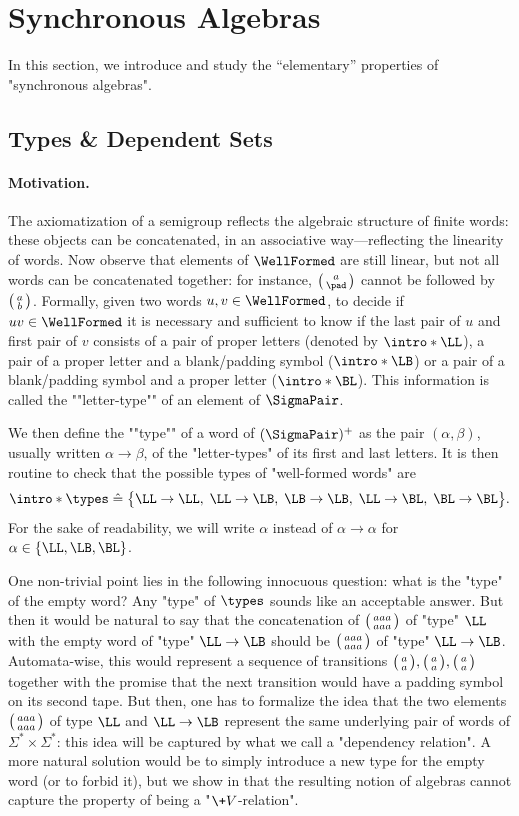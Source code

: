 \section{Synchronous Algebras}
\label{sec:synchronous-algebras}

In this section, we introduce and study the ``elementary'' properties of "synchronous algebras".

\subsection{Types \& Dependent Sets}

\paragraph*{Motivation.} The axiomatization of a semigroup reflects the algebraic structure of
finite words: these objects can be concatenated, in an associative way---reflecting the linearity of 
words. Now observe that elements of $\WellFormed$ are still linear, but
not all words can be concatenated together: for instance, $\pair{a}{\pad}$
cannot be followed by $\pair{a}{b}$.
Formally, given two words $u, v \in \WellFormed$, to decide if $uv \in \WellFormed$
it is necessary and sufficient to know if the last pair of $u$ and first pair of $v$
consists of a pair of proper letters (denoted by \AP$\intro*\LL$), a pair of a proper letter and a blank/padding symbol (\AP$\intro*\LB$) or a pair of a blank/padding symbol and a proper letter (\AP$\intro*\BL$). This information is called the \AP""letter-type"" of an element of $\SigmaPair$.

We then define the \AP""type"" of a word of $(\SigmaPair)^+$ as the pair $(\alpha, \beta)$,
usually written $\alpha \to \beta$, of the "letter-types" of its first and last letters.
It is then routine to check that the possible types of "well-formed words" are
\[
	\intro*\types \defeq \big\{
		\LL\to\LL,\; \LL\to\LB,\; \LB\to\LB,\; \LL\to\BL,\; \BL\to\BL
	\big\}.
\]
For the sake of readability, we will write $\alpha$ instead of $\alpha \to \alpha$
for $\alpha \in \{\LL, \LB, \BL\}$.

One non-trivial point lies in the following innocuous question: what is the "type" of the empty word? Any "type" of $\types$ sounds like an acceptable answer. But then
it would be natural to say that the concatenation of $\pair{aaa}{aaa}$ of "type" $\LL$ with the empty word of "type" $\LL\to\LB$ should be $\pair{aaa}{aaa}$ of "type" $\LL\to\LB$. Automata-wise,
this would represent a sequence of transitions $\pair{a}{a}, \pair{a}{a}, \pair{a}{a}$ together with
the promise that the next transition would have a padding symbol on its second tape. But then, 
one has to formalize the idea that the two elements $\pair{aaa}{aaa}$ of type $\LL$ and $\LL\to\LB$
represent the same underlying pair of words of $\Sigma^*\times\Sigma^*$: this idea will be captured by what we call a "dependency relation". A more natural solution would be to simply introduce a
new type for the empty word (or to forbid it), but we show in  that
the resulting notion of algebras cannot capture the property of being a "$\+V$-relation".

